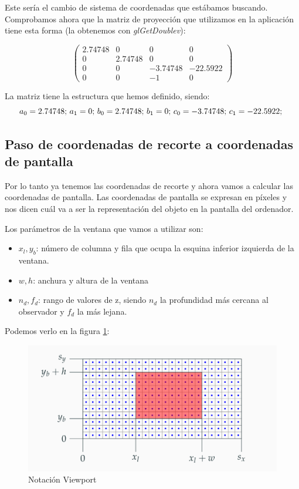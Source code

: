 \documentclass[a4paper,11pt, oneside]{book}
\begin{document}
Este sería el cambio de sistema de coordenadas que estábamos buscando. Comprobamos ahora que la matriz de proyección que utilizamos en la aplicación tiene esta forma (la obtenemos con \textit{glGetDoublev}):

$$\begin{pmatrix}
2.74748 & 0&0&0\\
0&2.74748 &0&0\\
0&0&-3.74748&-22.5922\\
0&0&-1&0
\end{pmatrix}$$

La matriz tiene la estructura que hemos definido, siendo:
$$a_0 = 2.74748\textup{;  }
a_1 = 0\textup{;  }
b_0 = 2.74748\textup{;  }
b_1 = 0\textup{;  }
c_0 = -3.74748\textup{;  }
c_1 = -22.5922\textup{;  }
$$

\subsection{Paso de coordenadas de recorte a coordenadas de pantalla}
Por lo tanto ya tenemos las coordenadas de recorte y ahora vamos a calcular las coordenadas de pantalla. Las coordenadas de pantalla se expresan en píxeles y nos dicen cuál va a ser la representación del objeto en la pantalla del ordenador.

Los parámetros de la ventana que vamos a utilizar son:
\begin{itemize}
	\item $x_l, y_b$: número de columna y fila que ocupa la esquina inferior izquierda de la ventana.
	\item $w,h$: anchura y altura de la ventana
	\item $n_d, f_d$: rango de valores de z, siendo $n_d$ la profundidad más cercana al observador y $f_d$ la más lejana.
\end{itemize}
Podemos verlo en la figura \ref{fig:viewport}:
\begin{figure}[H]
	
	\centering
	\includegraphics[width=\linewidth]{viewport}
	\caption{Notación Viewport}
	\label{fig:viewport}
	
\end{figure}
\end{document}
